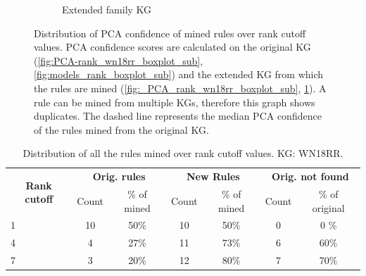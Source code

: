 \begin{figure}[!htb]
\begin{subfigure}{.5\textwidth}
  \caption{Extended family KG}
  \label{fig:_PCA_rank_family_boxplot_sub}
\end{subfigure}
\caption[Dist. of PCA conf. of rules over rank cutoff values]{Distribution of PCA confidence of mined rules over rank cutoff values. PCA confidence scores are calculated on the original KG (\ref{fig:PCA-rank_wn18rr_boxplot_sub}, \ref{fig:models_rank_boxplot_sub}) and the extended KG from which the rules are mined (\ref{fig:_PCA_rank_wn18rr_boxplot_sub}, \ref{fig:_PCA_rank_family_boxplot_sub}). A rule can be mined from multiple KGs, therefore this graph shows duplicates. The dashed line represents the median PCA confidence of the rules mined from the original KG.}
\label{fig:PCA_rank_boxplot}
\end{figure}


\begin{table}[htp]
\centering
\begin{tabular}{ccccccc}
\multicolumn{1}{c}{\multirow{2}{*}{\textbf{Rank cutoff}}} & \multicolumn{2}{c}{\textbf{Orig. rules}} & \multicolumn{2}{c}{\textbf{New Rules}}   & \multicolumn{2}{c}{\textbf{Orig. not found}} \\
\multicolumn{1}{c}{}                                      & Count & \multicolumn{1}{c|}{\% of mined} & Count & \multicolumn{1}{c|}{\% of mined} & Count            & \% of original            \\ \hline
\multicolumn{1}{l|}{1}                                    & 10    & \multicolumn{1}{c|}{50\%}        & 10    & \multicolumn{1}{c|}{50\%}        & 0                & 0 \%                        \\
\multicolumn{1}{l|}{4}                                    & 4     & \multicolumn{1}{c|}{27\%}        & 11    & \multicolumn{1}{c|}{73\%}        & 6                & 60\%                      \\
\multicolumn{1}{l|}{7}                                    & 3     & \multicolumn{1}{c|}{20\%}        & 12    & \multicolumn{1}{c|}{80\%}        & 7                & 70\%                     
\end{tabular}
\caption[Dist. of rules over rank cutoff - WN18RR KG.]{Distribution of all the rules mined over rank cutoff values. KG: WN18RR.}
\label{Tab:table_rules_ranks_wn18rr}
\end{table}


